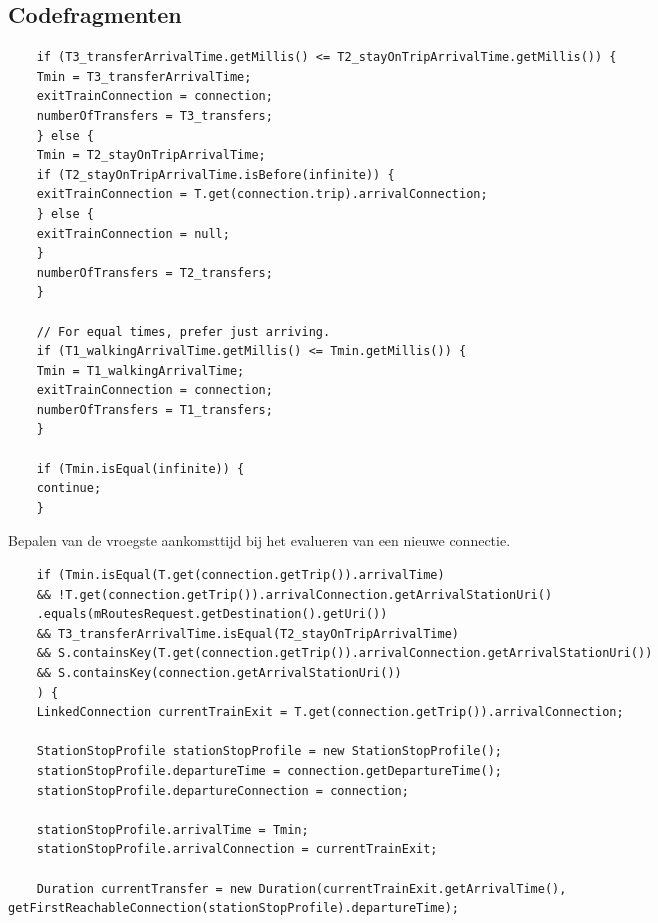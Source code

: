 \begin{appendices}
	
\chapter{Codefragmenten}
\label{appendix:code}


\begin{listing}[h]
	\begin{verbatim}
	if (T3_transferArrivalTime.getMillis() <= T2_stayOnTripArrivalTime.getMillis()) {
	Tmin = T3_transferArrivalTime;
	exitTrainConnection = connection;
	numberOfTransfers = T3_transfers;
	} else {
	Tmin = T2_stayOnTripArrivalTime;
	if (T2_stayOnTripArrivalTime.isBefore(infinite)) {
	exitTrainConnection = T.get(connection.trip).arrivalConnection;
	} else {
	exitTrainConnection = null;
	}
	numberOfTransfers = T2_transfers;
	}
	
	// For equal times, prefer just arriving.
	if (T1_walkingArrivalTime.getMillis() <= Tmin.getMillis()) {
	Tmin = T1_walkingArrivalTime;
	exitTrainConnection = connection;
	numberOfTransfers = T1_transfers;
	}
	
	if (Tmin.isEqual(infinite)) {
	continue;
	}
	\end{verbatim}
	\caption[CSA: Bepalen van vroegste aankomsttijd]{Bepalen van de vroegste aankomsttijd bij het evalueren van een nieuwe connectie.}
	\label{code:2:csaMin}
\end{listing}

\begin{listing}[h]
	\begin{verbatim}
	if (Tmin.isEqual(T.get(connection.getTrip()).arrivalTime)
	&& !T.get(connection.getTrip()).arrivalConnection.getArrivalStationUri()
	.equals(mRoutesRequest.getDestination().getUri())
	&& T3_transferArrivalTime.isEqual(T2_stayOnTripArrivalTime)
	&& S.containsKey(T.get(connection.getTrip()).arrivalConnection.getArrivalStationUri())
	&& S.containsKey(connection.getArrivalStationUri())
	) {
	LinkedConnection currentTrainExit = T.get(connection.getTrip()).arrivalConnection;
	
	StationStopProfile stationStopProfile = new StationStopProfile();
	stationStopProfile.departureTime = connection.getDepartureTime();
	stationStopProfile.departureConnection = connection;
	
	stationStopProfile.arrivalTime = Tmin;
	stationStopProfile.arrivalConnection = currentTrainExit;
	
	Duration currentTransfer = new Duration(currentTrainExit.getArrivalTime(), getFirstReachableConnection(stationStopProfile).departureTime);
	

\end{verbatim}
\end{listing}
\end{appendices}
